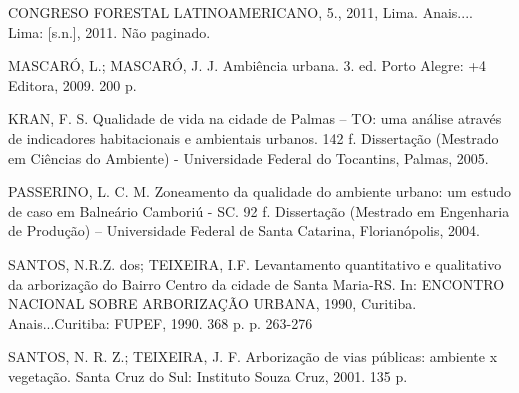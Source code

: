 \documentclass[article,12pt,onesidea,4paper,english,brazil]{abntex2}
\begin{document}
\noindent CONGRESO FORESTAL LATINOAMERICANO, 5., 2011, Lima. Anais.... Lima: [s.n.],
2011. Não paginado.

\noindent  MASCARÓ, L.; MASCARÓ, J. J. Ambiência urbana. 3. ed. Porto Alegre: +4 Editora, 2009. 200 p.

\noindent KRAN, F. S. Qualidade de vida na cidade de Palmas – TO: uma análise através de indicadores habitacionais e ambientais urbanos. 142 f. Dissertação (Mestrado em Ciências do Ambiente) - Universidade Federal do Tocantins, Palmas, 2005.

\noindent  PASSERINO, L. C. M. Zoneamento da qualidade do ambiente urbano: um estudo de caso em Balneário Camboriú - SC. 92 f. Dissertação (Mestrado em Engenharia de Produção) – Universidade Federal de Santa Catarina, Florianópolis, 2004.

\noindent  SANTOS, N.R.Z. dos; TEIXEIRA, I.F. Levantamento quantitativo e qualitativo da arborização do Bairro Centro da cidade de Santa Maria-RS. In: ENCONTRO NACIONAL SOBRE ARBORIZAÇÃO URBANA, 1990, Curitiba. Anais...Curitiba: FUPEF, 1990. 368 p. p. 263-276

\noindent SANTOS, N. R. Z.; TEIXEIRA, J. F. Arborização de vias públicas: ambiente x vegetação.
Santa Cruz do Sul: Instituto Souza Cruz, 2001. 135 p.

	
\end{document}
